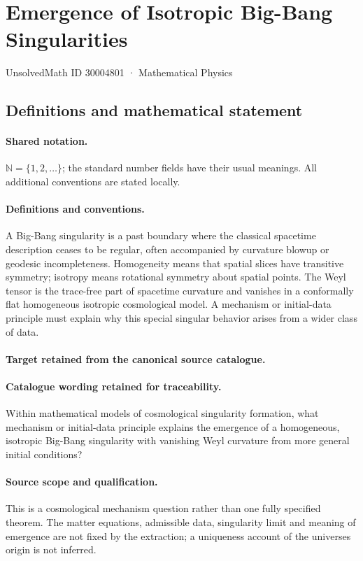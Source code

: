 \documentclass[11pt]{article}
\begin{document}
\setcounter{section}{30004800}
\section{Emergence of Isotropic Big-Bang Singularities}\label{30004801}
{\small UnsolvedMath ID 30004801 · Mathematical Physics}
\subsection{Definitions and mathematical statement}

\paragraph{Shared notation.}$\mathbb N=\{1,2,\ldots\}$; the standard number fields have their usual meanings. All additional conventions are stated locally.


\paragraph{Definitions and conventions.}
A Big-Bang singularity is a past boundary where the classical spacetime description ceases to be regular, often accompanied by curvature blowup or geodesic incompleteness. Homogeneity means that spatial slices have transitive symmetry; isotropy means rotational symmetry about spatial points. The Weyl tensor is the trace-free part of spacetime curvature and vanishes in a conformally flat homogeneous isotropic cosmological model. A mechanism or initial-data principle must explain why this special singular behavior arises from a wider class of data.

\paragraph{Target retained from the canonical source catalogue.}
\paragraph{Catalogue wording retained for traceability.}
Within mathematical models of cosmological singularity formation, what mechanism or initial-data principle explains the emergence of a homogeneous, isotropic Big-Bang singularity with vanishing Weyl curvature from more general initial conditions?

\paragraph{Source scope and qualification.}
This is a cosmological mechanism question rather than one fully specified theorem. The matter equations, admissible data, singularity limit and meaning of emergence are not fixed by the extraction; a uniqueness account of the universe\textquotesingle s origin is not inferred.
\end{document}
